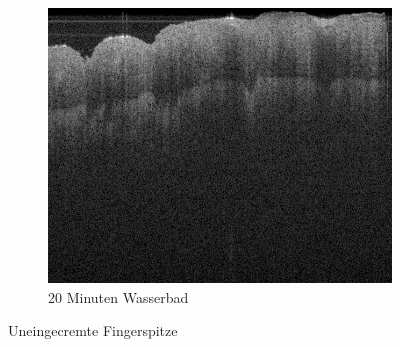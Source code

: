 \documentclass[german, %
parskip=full, %
bibliography=totoc, %
]{scrartcl}
\begin{document}
\begin{figure}[ht]
\begin{subfigure}[b]{0.3\textwidth}
	   \includegraphics[width=\textwidth]{finger_uncreme_3}
		 \caption{20 Minuten Wasserbad}
	\end{subfigure}
  \caption{Uneingecremte Fingerspitze}
	\label{fig:uncreme}
\end{figure}
\end{document}
